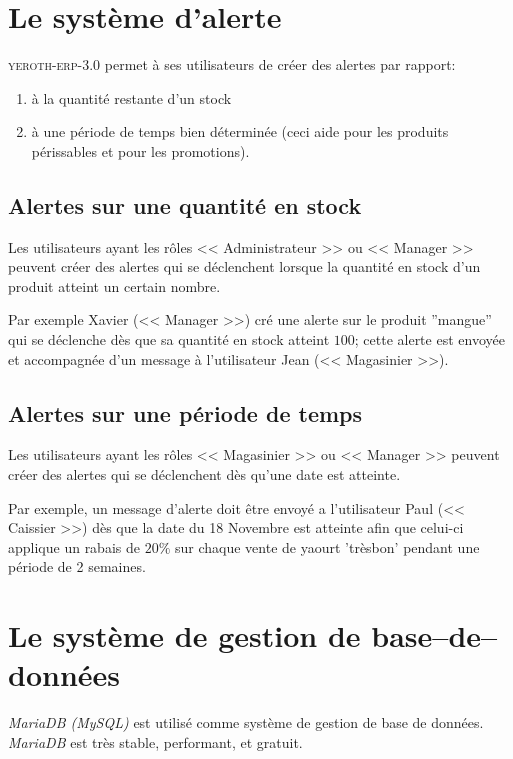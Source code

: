 \documentclass[a4paper, 10pt, twocolumn]{article}
\newcommand{\yeren}{\textsc{yeroth-erp-3.0}\xspace}
\newcommand{\manager}{<< Manager >>\xspace}
\newcommand{\caissier}{<< Caissier >>\xspace}
\newcommand{\administrateur}{<< Administrateur >>\xspace}
\newcommand{\magasinier}{<< Magasinier >>\xspace}
\begin{document}
\vspace{-1em}
\section{Le syst\`eme d'alerte}
\vspace{-0.5em}
\yeren permet \`a ses utilisateurs de cr\'eer
des alertes par rapport:
\begin{enumerate}[1)]
	\itemsep -0.5em
	\item \`a la quantit\'e restante d'un stock
	\item \`a une p\'eriode de temps bien
		d\'etermin\'ee (ceci aide pour les
		produits p\'erissables et pour les promotions).
\end{enumerate}

\vspace{-1em}

\subsection{Alertes sur une quantit\'e en stock}
\vspace{-0.1em}
Les utilisateurs ayant les r\^oles \administrateur ou
\manager peuvent cr\'eer des alertes qui se
d\'eclenchent lorsque la quantit\'e en stock d'un produit
atteint un certain nombre.

Par exemple Xavier (\manager) cr\'e une alerte sur le
produit ''mangue'' qui se d\'eclenche d\`es que sa quantit\'e
en stock atteint $100$; cette alerte est envoy\'ee et
accompagn\'ee d'un message \`a l'utilisateur Jean (\magasinier).

\vspace{-1em}

\subsection{Alertes sur une p\'eriode de temps}
\vspace{-0.1em}
Les utilisateurs ayant les r\^oles \magasinier ou
\manager peuvent cr\'eer des alertes qui se
d\'eclenchent d\`es qu'une date est atteinte.

Par exemple, un message d'alerte doit \^etre envoy\'e
a l'utilisateur Paul (\caissier) d\`es que
la date du 18 Novembre est atteinte afin que celui-ci
applique un rabais de $20\%$ sur chaque vente de
yaourt 'tr\`esbon' pendant une p\'eriode de 2 semaines.

\vspace{-1.1em}
\section{Le syst\`eme de gestion de base--de--donn\'ees}
\vspace{-0.3em}
\emph{MariaDB (MySQL)} est utilis\'e comme syst\`eme de gestion
de base de donn\'ees. \emph{MariaDB} est tr\`es stable,
performant, et gratuit.
\end{document}
